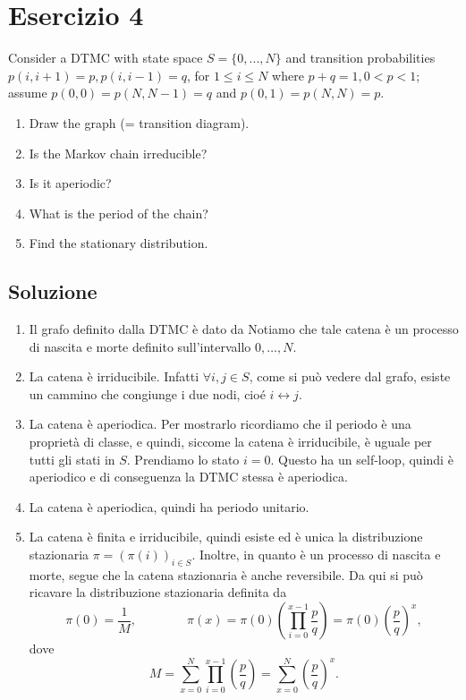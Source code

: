 \documentclass[
	12pt, %
]{fphw}
\begin{document}
\newpage
\section*{Esercizio 4}

\begin{problem}
	\smallskip
	Consider a DTMC with state space $S = \{0,...,N\}$ and transition probabilities $p(i, i+1) = p, p(i, i-1) = q$, for $1 \leq i \leq N$ where $p+q =1, 0 < p < 1$; assume $p(0, 0) = p(N,N-1)= q$ and $p(0, 1) = p(N,N)= p$.
	\medskip
	\begin{enumerate}
		\item Draw the graph (= transition diagram).
		\item Is the Markov chain irreducible?
		\item Is it aperiodic?
		\item What is the period of the chain?
		\item Find the stationary distribution.
	\end{enumerate}
	\smallskip
\end{problem}


\subsection*{Soluzione}

\begin{enumerate}
	\item Il grafo definito dalla DTMC è dato da
		Notiamo che tale catena è un processo di nascita e morte definito sull'intervallo $0, \dots, N$.
	\item La catena è irriducibile. Infatti $\forall i,j \in S$, come si può vedere dal grafo, esiste un cammino che congiunge i due nodi, cioé $i \leftrightarrow j$.
	\item La catena è aperiodica. Per mostrarlo ricordiamo che il periodo è una proprietà di classe, e quindi, siccome la catena è irriducibile, è uguale per tutti gli stati in $S$.
		Prendiamo lo stato $i = 0$. Questo ha un self-loop, quindi è aperiodico e di conseguenza la DTMC stessa è aperiodica.
	\item La catena è aperiodica, quindi ha periodo unitario.
	\item La catena è finita e irriducibile, quindi esiste ed è unica la distribuzione stazionaria $\pi = (\pi(i))_{i \in S}$.
		Inoltre, in quanto è un processo di nascita e morte, segue che la catena stazionaria è anche reversibile.
		Da qui si può ricavare la distribuzione stazionaria definita da
		\begin{equation*}
			\pi(0) = \frac{1}{M},	\qquad\qquad	\pi(x) = \pi(0) \left( \prod_{i=0}^{x-1} \frac{p}{q} \right) = \pi(0) \left(\frac{p}{q}\right)^x,
		\end{equation*}
		dove
		\begin{equation*}
			M = \sum_{x=0}^N \prod_{i=0}^{x-1} \left( \frac{p}{q} \right) = \sum_{x=0}^N \left(\frac{p}{q}\right)^x.
		\end{equation*}
		
	
\end{enumerate}
\end{document}
